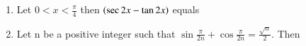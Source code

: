 \documentclass[journal,12pt,twocolumn]{IEEEtran}
\theoremstyle{remark}
\begin{document}
\begin{enumerate}
        \hfill{}
        \begin{enumerate}
        \end{enumerate}

    \item Let $0<x<\frac{\pi}{4}$ then $\left(\sec{2x} - \tan{2x}\right)$ equals
        
        \hfill{}
        \begin{enumerate}

        \end{enumerate}

    \item Let n be a positive integer such that $\sin{\frac{\pi}{2n}} + \cos{\frac{\pi}{2n}} = \frac{\sqrt{n}}{2}$. Then
        
        \hfill{}
        \begin{enumerate}


\end{enumerate}
\end{enumerate}
\end{document}

